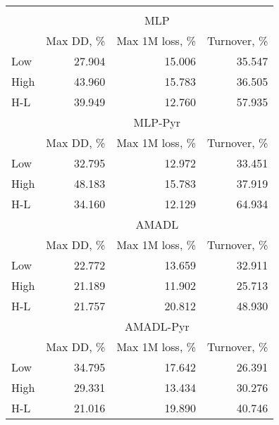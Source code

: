 \begin{tabular}{lrrr}
\hline \hline \\ [-1.8ex]
 & \multicolumn{3}{c}{MLP} \\
 \cmidrule(lr){2-4}
  & Max DD, \% & Max 1M loss, \% & Turnover, \% \\
\midrule
Low & 27.904 & 15.006 & 35.547 \\
High & 43.960 & 15.783 & 36.505 \\
H-L & 39.949 & 12.760 & 57.935 \\
\midrule
 & \multicolumn{3}{c}{MLP-Pyr} \\
 \cmidrule(lr){2-4}
  & Max DD, \% & Max 1M loss, \% & Turnover, \% \\
\midrule
Low & 32.795 & 12.972 & 33.451 \\
High & 48.183 & 15.783 & 37.919 \\
H-L & 34.160 & 12.129 & 64.934 \\
\midrule
 & \multicolumn{3}{c}{AMADL} \\
 \cmidrule(lr){2-4}
  & Max DD, \% & Max 1M loss, \% & Turnover, \% \\
\midrule
Low & 22.772 & 13.659 & 32.911 \\
High & 21.189 & 11.902 & 25.713 \\
H-L & 21.757 & 20.812 & 48.930 \\
\midrule
 & \multicolumn{3}{c}{AMADL-Pyr} \\
 \cmidrule(lr){2-4}
  & Max DD, \% & Max 1M loss, \% & Turnover, \% \\
\midrule
Low & 34.795 & 17.642 & 26.391 \\
High & 29.331 & 13.434 & 30.276 \\
H-L & 21.016 & 19.890 & 40.746 \\
\hline \hline
\end{tabular}